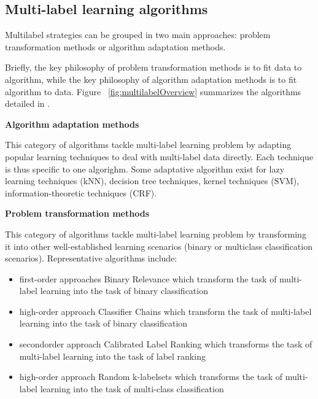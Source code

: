 \subsection{Multi-label learning algorithms}

Multilabel strategies can be grouped in two main approaches: problem transformation methods or algorithm adaptation methods.

Briefly, the key philosophy of problem transformation methods is to fit data to algorithm,
while the key philosophy of algorithm adaptation methods is to fit algorithm to data. Figure ~\ref{fig:multilabelOverview}
summarizes the algorithms detailed in \cite[Zhang and Zhou paper]{MultilabelReview}.

\textbf{Algorithm adaptation methods}

This category of algorithms tackle multi-label learning problem by adapting popular learning techniques to deal with multi-label data directly. Each technique is thus specific to one algorighm.
Some adaptative algorithm exist for lazy learning techniques (kNN), decision tree techniques, kernel techniques (SVM), information-theoretic techniques (CRF).

\textbf{Problem transformation methods}

This category of algorithms tackle multi-label learning problem by transforming it into other well-established learning scenarios (binary or multiclass classification scenarios). 
Representative algorithms include:
\begin{itemize}
 \item first-order approaches Binary Relevance which transform the task of multi-label learning into the task of binary classification 
 \item high-order approach Classifier Chains which transform the task of multi-label learning into the task of binary classification 
 \item secondorder approach Calibrated Label Ranking which transforms the task of multi-label learning into the task of label ranking
 \item high-order approach Random k-labelsets which transforms the task of multi-label learning into the task of multi-class classification
\end{itemize}

